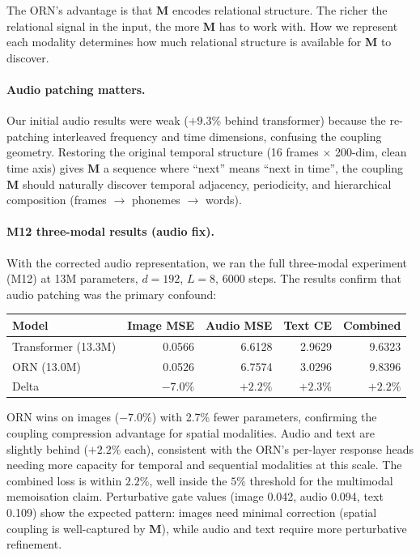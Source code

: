 \documentclass[11pt, a4paper]{article}
\newcommand{\M}{\mathbf{M}}
\theoremstyle{plain}
\theoremstyle{remark}
\begin{document}
The ORN's advantage is that $\M$ encodes relational structure.
The richer the relational signal in the input, the more $\M$ has to work with.
How we represent each modality determines how much relational structure is available for $\M$ to discover.

\paragraph{Audio patching matters.}
Our initial audio results were weak ($+9.3\%$ behind transformer) because the re-patching interleaved frequency and time dimensions, confusing the coupling geometry.
Restoring the original temporal structure (16 frames $\times$ 200-dim, clean time axis) gives $\M$ a sequence where ``next'' means ``next in time'', the coupling $\M$ should naturally discover temporal adjacency, periodicity, and hierarchical composition (frames $\to$ phonemes $\to$ words).

\paragraph{M12 three-modal results (audio fix).}
With the corrected audio representation, we ran the full three-modal experiment (M12) at 13M parameters, $d{=}192$, $L{=}8$, 6000 steps.
The results confirm that audio patching was the primary confound:

\begin{center}\small
\begin{tabular}{@{}lrrrr@{}}
\toprule
\textbf{Model} & \textbf{Image MSE} & \textbf{Audio MSE} & \textbf{Text CE} & \textbf{Combined} \\
\midrule
Transformer (13.3M) & 0.0566 & 6.6128 & 2.9629 & 9.6323 \\
ORN (13.0M) & 0.0526 & 6.7574 & 3.0296 & 9.8396 \\
Delta & $-7.0\%$ & $+2.2\%$ & $+2.3\%$ & $+2.2\%$ \\
\bottomrule
\end{tabular}
\end{center}

ORN wins on images ($-7.0\%$) with 2.7\% fewer parameters, confirming the coupling compression advantage for spatial modalities.
Audio and text are slightly behind ($+2.2\%$ each), consistent with the ORN's per-layer response heads needing more capacity for temporal and sequential modalities at this scale.
The combined loss is within $2.2\%$, well inside the $5\%$ threshold for the multimodal memoisation claim.
Perturbative gate values (image 0.042, audio 0.094, text 0.109) show the expected pattern: images need minimal correction (spatial coupling is well-captured by $\M$), while audio and text require more perturbative refinement.
\end{document}
